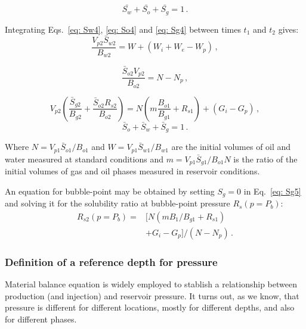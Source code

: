 \documentclass[authoryear,preprint,review,12pt]{elsarticle}
\begin{document}
\begin{equation}\label{eq: S14}
\bar{S_w}+\bar{S_o}+\bar{S_g}=1 \, .
\end{equation}

Integrating Eqs.~\eqref{eq: Sw4}, \eqref{eq: So4} and \eqref{eq: Sg4} between times $t_1$ and $t_2$ gives:
\begin{equation}\label{eq: Sw5}
\frac{V_{p2} \bar{S}_{w2}}{B_{w2}}=W+\left(W_i+W_e-W_p\right) \, ,
\end{equation}

\begin{equation}\label{eq: So5}
\frac{\bar{S}_{o2} V_{p2}}{B_{o2}} = N-N_p \, ,
\end{equation}

\begin{equation}\label{eq: Sg5}
V_{p2}\left(\frac{\bar{S}_{g2}}{B_{g2}} +\frac{\bar{S}_{o2} R_{s2}}{B_{o2}}\right) = N\left(m\frac{B_{o1}}{B_{g1}} + R_{s1}\right) +\left(G_i-G_p\right) \, ,
\end{equation}
%
\begin{equation}\label{eq: S15}
\bar{S}_o+\bar{S}_w+\bar{S}_g=1 \, .
\end{equation}

Where $N=V_{p1} \bar{S}_{o1}/B_{o1}$ and $W=V_{p1} \bar{S}_{w1}/B_{w1}$ are the initial volumes of oil and water measured at standard conditions and $m=V_{p1} \bar{S}_{g1}/B_{o1} N$ is the ratio of the initial volumes of gas and oil phases measured in reservoir conditions.

An equation for bubble-point may be obtained by setting $S_g=0$ in Eq.~\eqref{eq: Sg5} and solving it for the solubility ratio at bubble-point pressure $R_s(p=P_b)$:
\begin{equation}
\begin{split}
R_{s2}\left(p=P_b\right) = &\Big[N\left(m B_{1}/B_{g1} +R_{s1}\right)\\
&+G_i-G_p\Big]/\left(N-N_p\right) \, .
\end{split}
\end{equation}

\subsubsection{Definition of a reference depth for pressure}

Material balance equation is widely employed to stablish a relationship between production (and injection) and reservoir pressure. It turns out, as we know, that pressure is different for different locations, mostly for different depths, and also for different phases.
\end{document}
